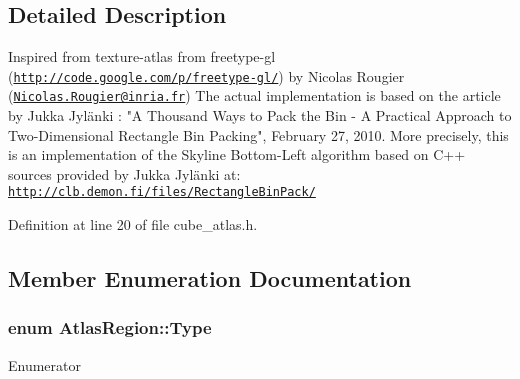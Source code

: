 \subsection{Detailed Description}
Inspired from texture-\/atlas from freetype-\/gl (\href{http://code.google.com/p/freetype-gl/}{\tt http\+://code.\+google.\+com/p/freetype-\/gl/}) by Nicolas Rougier (\href{mailto:Nicolas.Rougier@inria.fr}{\tt Nicolas.\+Rougier@inria.\+fr}) The actual implementation is based on the article by Jukka Jylänki \+: "A Thousand Ways to Pack the Bin -\/ A Practical Approach to Two-\/\+Dimensional Rectangle Bin Packing", February 27, 2010. More precisely, this is an implementation of the Skyline Bottom-\/\+Left algorithm based on C++ sources provided by Jukka Jylänki at\+: \href{http://clb.demon.fi/files/RectangleBinPack/}{\tt http\+://clb.\+demon.\+fi/files/\+Rectangle\+Bin\+Pack/} 

Definition at line 20 of file cube\+\_\+atlas.\+h.



\subsection{Member Enumeration Documentation}
\hypertarget{struct_atlas_region_a51d027756a617938bf45be832663e2c2}{
\subsubsection[{Type}]{\setlength{\rightskip}{0pt plus 5cm}enum {\bf Atlas\+Region\+::\+Type}}}\label{struct_atlas_region_a51d027756a617938bf45be832663e2c2}
\begin{Desc}
\item[Enumerator]\par
\begin{description}
\item[{\em 
\hypertarget{struct_atlas_region_a51d027756a617938bf45be832663e2c2aec663ca56a7d66e0b922d88131dc9798}{T\+Y\+P\+E\+\_\+\+G\+R\+A\+Y}\label{struct_atlas_region_a51d027756a617938bf45be832663e2c2aec663ca56a7d66e0b922d88131dc9798}
}]\item[{\em 
\hypertarget{struct_atlas_region_a51d027756a617938bf45be832663e2c2a3010705c5f10ae5b40dee6de2fb1bb63}{T\+Y\+P\+E\+\_\+\+B\+G\+R\+A8}\label{struct_atlas_region_a51d027756a617938bf45be832663e2c2a3010705c5f10ae5b40dee6de2fb1bb63}
}]\end{description}
\end{Desc}


